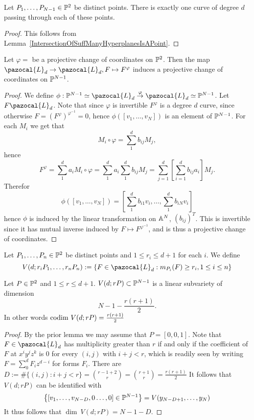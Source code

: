     \begin{corollary}
        Let $P_1,\dots,P_{N-1}\in \mathbb{P}^2$ be distinct points. There is exactly one curve of degree $d$ passing through each of these points. 
    \end{corollary}
    \begin{proof}
        This follows from Lemma~\ref{IntersectionOfSuffManyHyperplanesIsAPoint}.
    \end{proof}
    \begin{lemma}
        Let $\varphi=$ be a projective change of coordinates on $\mathbb{P}^2$. Then the map $\pazocal{L}_d \rightarrow \pazocal{L}_d, F\mapsto F^\varphi$ induces a projective change of coordinates on $\mathbb{P}^{N-1}$.
    \end{lemma}
    \begin{proof}
        We define $\phi : \Pp^{N-1} \simeq \pazocal{L}_d \overset{\varphi}{\rightarrow} \pazocal{L}_d \simeq \Pp^{N-1}$. Let $F\pazocal{L}_d$. Note that since $\varphi$ is invertible $F^\varphi$ is a degree $d$ curve, since otherwise $F=(F^{\varphi})^{\varphi^{-1}}= 0$, hence $\phi([v_1,\dots,v_N])$ is an element of $\mathbb{P}^{N-1}$. For each $M_i$ we get that 
        $$M_i\circ \varphi= \sum_1^d b_{ij}M_j,$$
        hence 
        $$F^\varphi = \sum_1^d a_iM_i\circ \varphi = \sum_1^d a_i\sum_1^d b_{ij}M_j= \sum_{j=1}^d \left[\sum_{i=1}^d b_{ij}a_i \right] M_j.$$
        Therefor 
        $$\phi([v_1,\dots,v_N])=[\sum_1^d b_{i1}v_i,\dots, \sum_1^d b_{iN} v_i]$$
        hence $\phi$ is induced by the linear transformation on $\mathbb{A}^N$, $(b_{ij})^T$. This is invertible since it has mutual inverse induced by $F \mapsto F^{\varphi^{-1}}$, and is thus a projective change of coordinates.
    \end{proof}
    \begin{definition}
        Let $P_1,\dots,P_n\in \mathbb{P}^2$ be distinct points and $1\leq r_i \leq d+1$ for each $i$. We define 
        $$V(d;r_iP_1,\dots,r_nP_n):=\left\{ F\in \pazocal{L}_d: m_{P_i}(F)\geq r_i,1\leq i\leq n\right\} $$
    \end{definition}
    \begin{lemma}
        Let $P\in \mathbb{P}^2$ and $1\leq r \leq d+1$. $V(d; rP) \subset \mathbb{P}^{N-1}$ is a linear subvariety of dimension 
        $$N-1-\frac{r(r+1)}{2}.$$
        In other words $\mathrm{codim} \ V(d;rP) = \frac{r(r+1)}{2}$
    \end{lemma}
    \begin{proof}
        By the prior lemma we may assume that $P=[0,0,1]$. Note that $F\in \pazocal{L}_d$ has multiplicity greater than $r$ if and only if the coefficient of $F$ at $x^iy^jz^k$ is $0$ for every $(i,j)$ with $i+j< r$, which is readily seen by writing $F=\sum_0^d F_i z^{d-i}$ for forms $F_i$. There are $D:=\#\{(i,j) : i+j<r\} = {r-1+2\choose r} = {r+1\choose r} = \frac{r(r+1)}{2}$ It follows that $V(d;rP)$ can be identified with
        $$\left\{[v_1,\dots,v_{N-D},0\dots,0]\in \mathbb{P}^{N-1} \right\}= V(y_{N-D+1},\dots,y_N)$$
        It thus follows that $\dim\ V(d; rP) = N-1-D.$
    \end{proof}
